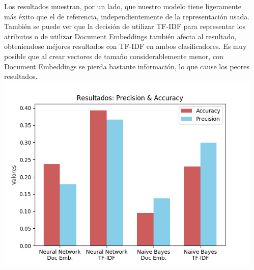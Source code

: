 \documentclass[25pt,landscape]{tikzposter}
\begin{document}
\begin{columns}
{    	\paragraph{}Los resultados muestran, por un lado, que nuestro modelo tiene ligeramente más éxito que el de referencia, independientemente de la representación usada. También se puede ver que la decisión de utilizar TF-IDF para representar los atributos o de utilizar Document Embeddings también afecta al resultado, obteniendose méjores resultados con TF-IDF en ambos clasificadores. Es muy posible que al crear vectores de tamaño considerablemente menor, con Document Embeddings se pierda bastante información, lo que cause los peores resultados.
		\includegraphics[scale=1.9]{img/PrecisionAccuracy.jpeg}
    }
    
\end{columns}
 	
\end{document}
